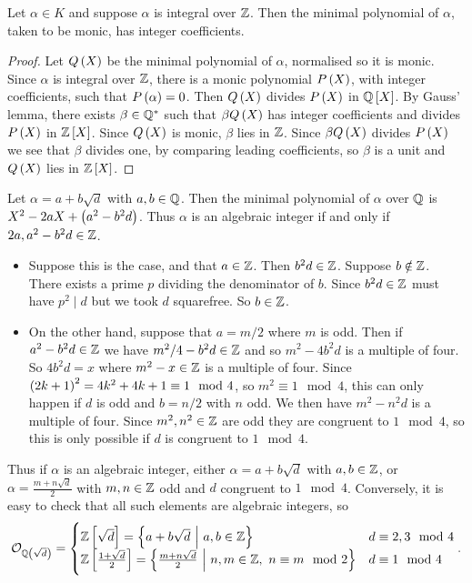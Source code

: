 \begin{lemma}
Let $ \alpha \in K $ and suppose $ \alpha $ is integral over $ \mathbb{Z} $. Then the minimal polynomial of $ \alpha $, taken to be monic, has integer coefficients.
\end{lemma}

\begin{proof}
Let $ Q\br{X} $ be the minimal polynomial of $ \alpha $, normalised so it is monic. Since $ \alpha $ is integral over $ \mathbb{Z} $, there is a monic polynomial $ P\br{X} $, with integer coefficients, such that $ P\br{\alpha} = 0 $. Then $ Q\br{X} $ divides $ P\br{X} $ in $ \QQ\sbr{X} $. By Gauss' lemma, there exists $ \beta \in \mathbb{Q}^* $ such that $ \beta Q\br{X} $ has integer coefficients and divides $ P\br{X} $ in $ \ZZ\sbr{X} $. Since $ Q\br{X} $ is monic, $ \beta $ lies in $ \mathbb{Z} $. Since $ \beta Q\br{X} $ divides $ P\br{X} $ we see that $ \beta $ divides one, by comparing leading coefficients, so $ \beta $ is a unit and $ Q\br{X} $ lies in $ \ZZ\sbr{X} $.
\end{proof}

Let $ \alpha = a + b\sqrt{d} $ with $ a, b \in \mathbb{Q} $. Then the minimal polynomial of $ \alpha $ over $ \mathbb{Q} $ is $ X^2 - 2aX + \br{a^2 - b^2d} $. Thus $ \alpha $ is an algebraic integer if and only if $ 2a, a^2 - b^2d \in \mathbb{Z} $.
\begin{itemize}
\item Suppose this is the case, and that $ a \in \mathbb{Z} $. Then $ b^2d \in \mathbb{Z} $. Suppose $ b \notin \mathbb{Z} $. There exists a prime $ p $ dividing the denominator of $ b $. Since $ b^2d \in \mathbb{Z} $ must have $ p^2 \mid d $ but we took $ d $ squarefree. So $ b \in \mathbb{Z} $.
\item On the other hand, suppose that $ a = m / 2 $ where $ m $ is odd. Then if $ a^2 - b^2d \in \mathbb{Z} $ we have $ m^2 / 4 - b^2d \in \mathbb{Z} $ and so $ m^2 - 4b^2d $ is a multiple of four. So $ 4b^2d = x $ where $ m^2 - x \in \mathbb{Z} $ is a multiple of four. Since $ \br{2k + 1}^2 = 4k^2 + 4k + 1 \equiv 1 \mod 4 $, so $ m^2 \equiv 1 \mod 4 $, this can only happen if $ d $ is odd and $ b = n / 2 $ with $ n $ odd. We then have $ m^2 - n^2d $ is a multiple of four. Since $ m^2, n^2 \in \mathbb{Z} $ are odd they are congruent to $ 1 \mod 4 $, so this is only possible if $ d $ is congruent to $ 1 \mod 4 $.
\end{itemize}
Thus if $ \alpha $ is an algebraic integer, either $ \alpha = a + b\sqrt{d} $ with $ a, b \in \mathbb{Z} $, or $ \alpha = \tfrac{m + n\sqrt{d}}{2} $ with $ m, n \in \mathbb{Z} $ odd and $ d $ congruent to $ 1 \mod 4 $. Conversely, it is easy to check that all such elements are algebraic integers, so
$$ \OOO_{\QQ\br{\sqrt{d}}} =
\begin{cases}
\ZZ\sbr{\sqrt{d}} = \cbr{a + b\sqrt{d} \st a, b \in \ZZ} & d \equiv 2, 3 \mod 4 \\
\ZZ\sbr{\tfrac{1 + \sqrt{d}}{2}} = \cbr{\tfrac{m + n\sqrt{d}}{2} \st n, m \in \ZZ, \ n \equiv m \mod 2} & d \equiv 1 \mod 4
\end{cases}.
$$

